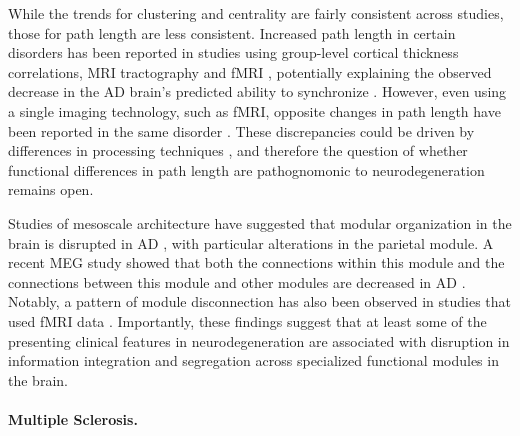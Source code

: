 \documentclass[12pt]{article}
\begin{document}
While the trends for clustering and centrality are fairly consistent across studies, those for path length are less consistent. Increased path length in certain disorders has been reported in studies using group-level cortical thickness correlations, MRI tractography and fMRI \cite{agosta2013brain,he2008structural,lo2010diffusion,yao2010abnormal,liu2012altered}, potentially explaining the observed decrease in the AD brain's predicted ability to synchronize \cite{tahaei2012synchronizability}. However, even using a single imaging technology, such as fMRI, opposite changes in path length have been reported in the same disorder \cite{agosta2013brain,sanz2010loss,zhao2012disrupted,liu2012altered}. These discrepancies could be driven by differences in processing techniques \cite{Stam2014}, and therefore the question of whether functional differences in path length are pathognomonic to neurodegeneration remains open. 

Studies of mesoscale architecture have suggested that modular organization in the brain is disrupted in AD \cite{brier2014functional,de2012activity,chen2013modular}, with particular alterations in the parietal module. A recent MEG study showed that both the connections within this module and the connections between this module and other modules are decreased in AD \cite{de2012activity}. Notably, a pattern of module disconnection has also been observed in studies that used fMRI data \cite{brier2014functional,chen2013modular,cciftcci2011minimum}. Importantly, these findings suggest that at least some of the presenting clinical features in neurodegeneration are associated with disruption in information integration and segregation across specialized functional modules in the brain.


\paragraph{Multiple Sclerosis.}
\end{document}
